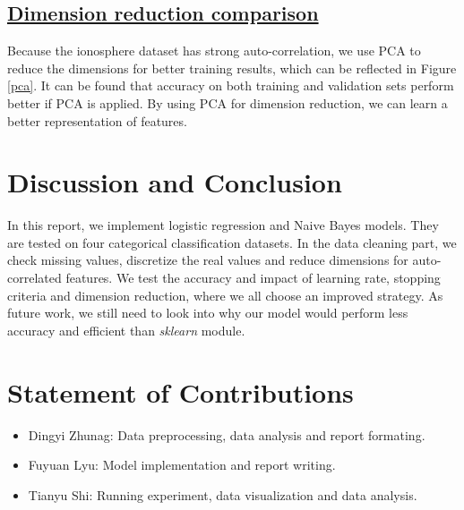\documentclass[11pt]{scrartcl}
\begin{document}
\subsection*{\underline{Dimension reduction comparison}}
Because the ionosphere dataset has strong auto-correlation, we use PCA to reduce the dimensions for better training results, which can be reflected in Figure \ref{pca}. It can be found that accuracy on both training and validation sets perform better if PCA is applied. By using PCA for dimension reduction, we can learn a better representation of features.


\section{Discussion and Conclusion}

In this report, we implement logistic regression and Naive Bayes models. They are tested on four categorical classification datasets. In the data cleaning part, we check missing values, discretize the real values and reduce dimensions for auto-correlated features. We test the accuracy and impact of learning rate, stopping criteria and dimension reduction, where we all choose an improved strategy. As future work, we still need to look into why our model would perform less accuracy and efficient than \textit{sklearn} module.

\section{Statement of Contributions}

\begin{itemize}
	\item Dingyi Zhunag: Data preprocessing, data analysis and report formating.
	\item Fuyuan Lyu: Model implementation and report writing.
	\item Tianyu Shi: Running experiment, data visualization and data analysis.
\end{itemize}



\end{document}
